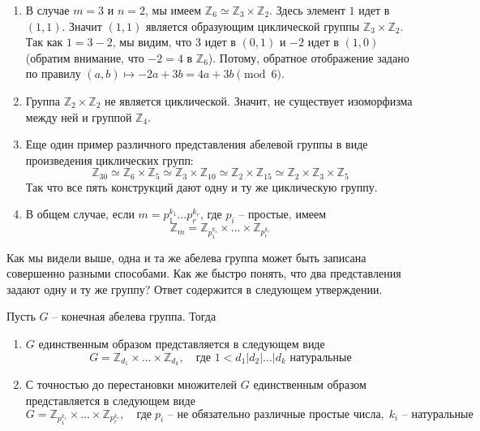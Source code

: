 \begin{examples}
\begin{enumerate}
\item В случае $m = 3$ и $n = 2$, мы имеем $\mathbb Z_6\simeq \mathbb Z_3\times\mathbb Z_2$.
Здесь элемент $1$ идет в $(1, 1)$.
Значит $(1, 1)$ является образующим циклической группы $\mathbb Z_3\times \mathbb Z_2$.
Так как $1 = 3 - 2$, мы видим, что $3$ идет в $(0, 1)$ и $-2$ идет в $(1,0)$  (обратим внимание, что $- 2 = 4$ в $\mathbb Z_6$).
Потому, обратное отображение задано по правилу $(a, b)\mapsto -2a + 3b = 4a + 3b\pmod 6$.

\item Группа $\mathbb Z_2\times \mathbb Z_2$ не является циклической.
Значит, не существует изоморфизма между ней и группой $\mathbb Z_4$.

\item Еще один пример различного представления абелевой группы в виде произведения циклических групп:
\[
\mathbb Z_{30} \simeq \mathbb Z_6 \times \mathbb Z_5 \simeq \mathbb Z_3 \times\mathbb Z_{10}\simeq\mathbb Z_2 \times \mathbb Z_{15} \simeq\mathbb Z_2\times\mathbb Z_3\times \mathbb Z_5
\]
Так что все пять конструкций дают одну и ту же циклическую группу.

\item В общем случае, если $m = p_1^{k_1}\ldots p_r^{k_r}$, где $p_i$ -- простые, имеем
\[
\mathbb Z_{m} = \mathbb Z_{p_1^{k_1}}\times \ldots \times \mathbb Z_{p_r^{k_r}}
\]
\end{enumerate}
\end{examples}

Как мы видели выше, одна и та же абелева группа может быть записана совершенно разными способами.
Как же быстро понять, что два представления задают одну и ту же группу?
Ответ содержится в следующем утверждении.

\begin{claim}
\label{claim::FAGClass}
Пусть $G$ -- конечная абелева группа.
Тогда
\begin{enumerate}
\item $G$ единственным образом представляется в следующем виде
\[
G = \mathbb Z_{d_1}\times \ldots \times \mathbb Z_{d_k},\quad\text{где } 1 < d_1|d_2|\ldots|d_k\text{ натуральные}
\]

\item С точностью до перестановки множителей $G$ единственным образом представляется в следующем виде
\[
G = \mathbb Z_{p_1^{k_1}}\times \ldots \times \mathbb Z_{p_r^{k_r}},\quad \text{где}\; p_i \text{ -- не обязательно различные простые числа},\; k_i\text{ -- натуральные}
\]
\end{enumerate}
\end{claim}

